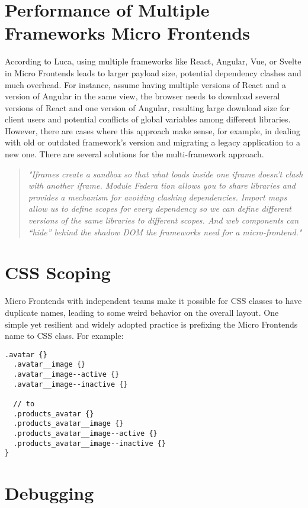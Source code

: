 \documentclass[a4paper]{book}
\begin{document}
\section{Performance of Multiple Frameworks Micro Frontends}
According to Luca, using multiple frameworks like React, Angular, Vue, or Svelte in Micro Frontends leads to larger payload size, potential dependency clashes and much overhead. For instance, assume having multiple versions of React and a version of Angular in the same view, the browser needs to download several versions of React and one version of Angular, resulting large download size for client users and potential conflicts of global variables among different libraries. However, there are cases where this approach make sense, for example, in dealing with old or outdated framework's version and migrating a legacy application to a new one. There are several solutions for the multi-framework approach. \cite{Luc21}
\begin{quote}
    \textit{"Iframes create a
sandbox so that what loads inside one iframe doesn’t clash with another
iframe. Module Federa   tion allows you to share libraries and provides a
mechanism for avoiding clashing dependencies. Import maps allow us to
define scopes for every dependency so we can define different versions of
the same libraries to different scopes. And web components can “hide”
behind the shadow DOM the frameworks need for a micro-frontend."} \cite{Luc21}
\end{quote}

\section{CSS Scoping}
Micro Frontends with independent teams make it possible for CSS classes to have duplicate names, leading to some weird behavior on the overall layout. One simple yet resilient and widely adopted practice is prefixing the Micro Frontends name to CSS class. For example:
\begin{lstlisting}[caption={pilet-products CSS prefixing \cite{Luc21}}]
  .avatar {}
  .avatar__image {}
  .avatar__image--active {}
  .avatar__image--inactive {}
  
  // to
  .products_avatar {}
  .products_avatar__image {}
  .products_avatar__image--active {}
  .products_avatar__image--inactive {}
}
\end{lstlisting}

\section{Debugging}
\end{document}
